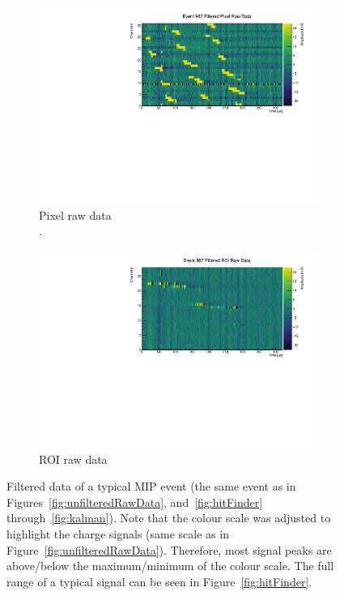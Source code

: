 \documentclass[instruments,article,submit,moreauthors,pdftex]{Definitions/mdpi}
\begin{document}
\begin{figure}[htb]
	\centering
	\begin{subfigure}{\textwidth}
		\centering
		\includegraphics[viewport=0 0 550 290, clip, width=\textwidth]{event967_rawFilteredPixel}
		\caption{Pixel raw data\\.}
		\label{fig:filteredRawData_a}
	\end{subfigure}
	\begin{subfigure}{\textwidth}
		\centering
		\includegraphics[viewport=0 0 550 290, clip, width=\textwidth]{event967_rawFilteredROI}
		\caption{ROI raw data}
		\label{fig:filteredRawData_b}
	\end{subfigure}
	\caption{Filtered data of a typical MIP event (the same event as in Figures~\ref{fig:unfilteredRawData}, and~\ref{fig:hitFinder} through~\ref{fig:kalman}).
		Note that the colour scale was adjusted to highlight the charge signals (same scale as in Figure~\ref{fig:unfilteredRawData}).
		Therefore, most signal peaks are above/below the maximum/minimum of the colour scale.
		The full range of a typical signal can be seen in Figure~\ref{fig:hitFinder}.}
	\label{fig:filteredRawData}
\end{figure}
\end{document}
